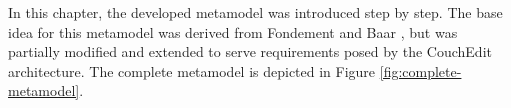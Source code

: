 
In this chapter, the developed metamodel was introduced step by step. The base idea for this metamodel was derived from Fondement and Baar \cite{fondement_making_2005}, but was partially modified and extended to serve requirements posed by the CouchEdit architecture. The complete metamodel is depicted in Figure \ref{fig:complete-metamodel}.